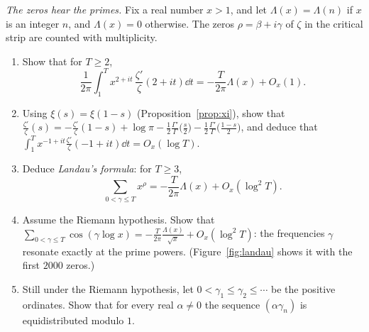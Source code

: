 \begin{exercise}[$\star\star\star$]\label{pb:landauzeros}
\emph{The zeros hear the primes.} Fix a real number $x>1$, and let $\Lambda(x)=\Lambda(n)$ if $x$ is an integer $n$, and $\Lambda(x)=0$ otherwise. The zeros
$\rho=\beta+i\gamma$ of $\zeta$ in the critical strip are counted with multiplicity.
\begin{enumerate}[label=(\alph*)]
\item Show that for $T\ge2$,
\[
\frac1{2\pi}\int_1^Tx^{2+it}\,\frac{\zeta'}\zeta(2+it)\dd t=-\frac T{2\pi}\Lambda(x)+O_x(1).
\]
\item Using $\xi(s)=\xi(1-s)$ (Proposition~\ref{prop:xi}), show that
$\frac{\zeta'}\zeta(s)=-\frac{\zeta'}\zeta(1-s)+\log\pi-\frac12\frac{\Gamma'}\Gamma\bigl(\frac s2\bigr)-\frac12\frac{\Gamma'}\Gamma\bigl(\frac{1-s}2\bigr)$, and deduce that
$\int_1^Tx^{-1+it}\frac{\zeta'}\zeta(-1+it)\dd t=O_x(\log T)$.
\item Deduce \emph{Landau's formula}: for $T\ge3$,
\[
\sum_{0<\gamma\le T}x^\rho=-\frac T{2\pi}\Lambda(x)+O_x(\log^2T).
\]
\item Assume the Riemann hypothesis. Show that $\sum_{0<\gamma\le T}\cos(\gamma\log x)=-\frac T{2\pi}\frac{\Lambda(x)}{\sqrt x}+O_x(\log^2T)$: the frequencies $\gamma$
resonate exactly at the prime powers. (Figure~\ref{fig:landau} shows it with the first $2000$ zeros.)
\item Still under the Riemann hypothesis, let $0<\gamma_1\le\gamma_2\le\cdots$ be the positive ordinates. Show that for every real $\alpha\ne0$ the sequence
$(\alpha\gamma_n)$ is equidistributed modulo $1$.
\end{enumerate}
\end{exercise}

